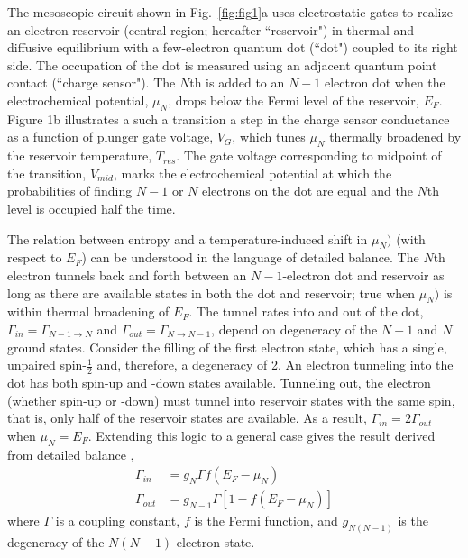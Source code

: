 \documentclass[twocolumn,showpacs,preprintnumbers,amsmath,amssymb,pra,aps,superscriptaddress]{revtex4-1}
\begin{document}
The mesoscopic circuit shown in Fig.~\ref{fig:fig1}a uses electrostatic gates to realize an electron reservoir (central region; hereafter ``reservoir") in thermal and diffusive equilibrium with a few-electron quantum dot (``dot") coupled to its right side.  The occupation of the dot is measured using an adjacent quantum point contact (``charge sensor")\cite{Staring2007, Thierschmann2015}.  The $N$th is added to an $N-1$ electron dot when the electrochemical potential, $\mu_{N}$, drops below the Fermi level of the reservoir, $E_F$. Figure 1b illustrates a such a transition \textemdash a step in the charge sensor conductance as a function of plunger gate voltage, $V_G$, which tunes $\mu_{N}$ \textemdash thermally broadened by the reservoir temperature, $T_{res}$.  The gate voltage corresponding to midpoint of the transition, $V_{mid}$, marks the electrochemical potential at which the probabilities of finding $N-1$ or $N$ electrons on the dot are equal and the $N$th level is occupied half the time. 
  
The relation between entropy and a temperature-induced shift in $\mu_{N})$ (with respect to $E_F$) can be understood in the language of detailed balance.  The $N$th electron tunnels back and forth between an $N-1$-electron dot and reservoir as long as there are available states in both the dot and reservoir; true when $\mu_{N})$ is within thermal broadening of $E_F$.  The tunnel rates into and out of the dot, $\Gamma_{in}=\Gamma_{N-1\rightarrow N}$ and $\Gamma_{out}=\Gamma_{N\rightarrow N-1}$, depend on degeneracy of the $N-1$ and $N$ ground states.  Consider the filling of the first electron state, which has a single, unpaired spin-$\frac{1}{2}$ and, therefore, a degeneracy of 2. An electron tunneling into the dot has both spin-up and -down states available.  Tunneling out, the electron (whether spin-up or -down) must tunnel into reservoir states with the same spin, that is, only half of the reservoir states are available. As a result, $\Gamma_{in} = 2\Gamma_{out}$ when $\mu_{N}=E_F$. Extending this logic to a general case gives the result derived from detailed balance \cite{Gustavsson2009}, 
%
\begin{align}
	\Gamma_{in} &=  g_{N} \Gamma f(E_F - \mu_{N}) \nonumber \\
	\Gamma_{out} &= g_{N-1} \Gamma [1 - f(E_F - \mu_{N})] \label{eqn:rates}
\end{align}
%
where $\Gamma$ is a coupling constant, $f$ is the Fermi function, and $g_{N(N-1)}$ is the degeneracy of the $N(N-1)$ electron state.
\end{document}
